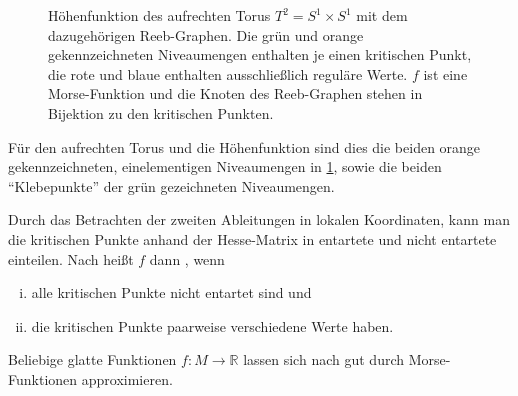 \begin{figure}
	\caption[Höhenfunktion des aufrechten Torus mit dem dazugehörigen Reeb-Graphen]{Höhenfunktion des aufrechten Torus $T^2=S^1 \times S^1$ mit dem dazugehörigen Reeb-Graphen. Die grün und orange gekennzeichneten Niveaumengen enthalten je einen kritischen Punkt, die rote und blaue enthalten ausschließlich reguläre Werte. $f$ ist eine Morse-Funktion und die Knoten des Reeb-Graphen stehen in Bijektion zu den kritischen Punkten.}\label{fig:torus_reeb}
\end{figure}
Für den aufrechten Torus und die Höhenfunktion sind dies die beiden orange gekennzeichneten, einelementigen Niveaumengen in \cref{fig:torus_reeb}, sowie die beiden \enquote{Klebepunkte} der grün gezeichneten Niveaumengen.

Durch das Betrachten der zweiten Ableitungen in lokalen Koordinaten, kann man die kritischen Punkte anhand der Hesse-Matrix in entartete und nicht entartete einteilen. 
Nach \textcite{compTopo} heißt $f$ dann , wenn 
\begin{enumerate}[(i)]
	\item alle kritischen Punkte nicht entartet sind und
	\item\label{enum:def:morse:2} die kritischen Punkte paarweise verschiedene Werte haben. 
\end{enumerate}
Beliebige glatte Funktionen $f \colon M \to \mathbb{R}$ lassen sich nach \textcite[Corr.~6.8]{MilnorMorse} gut durch Morse-Funktionen approximieren.

